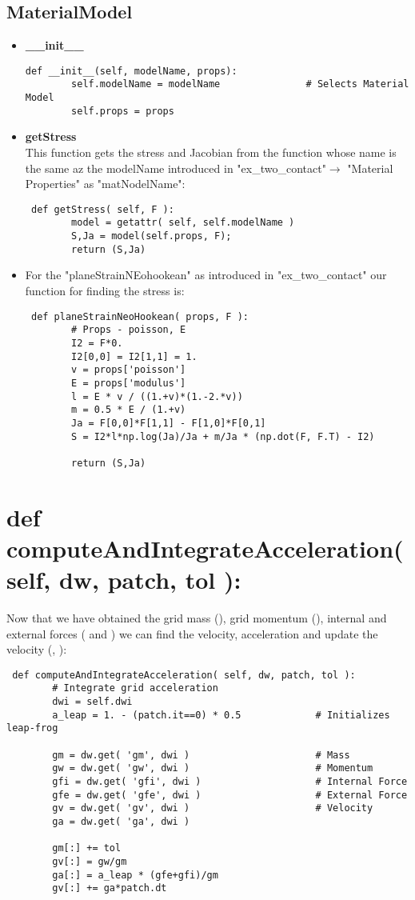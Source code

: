\documentclass[11pt,fleqn]{book} %
\begin{document}
\subsection{MaterialModel}
\begin{itemize}
\item \textbf{\_\_init\_\_}\\
\begin{lstlisting}
def __init__(self, modelName, props):
        self.modelName = modelName               # Selects Material Model
        self.props = props        
\end{lstlisting}
\item \textbf{getStress}\\
This function gets the stress and Jacobian from the function whose name is the same az the modelName introduced in "ex\_two\_contact"$\rightarrow$ "Material Properties" as "matNodelName":
\begin{lstlisting}
 def getStress( self, F ):
        model = getattr( self, self.modelName )
        S,Ja = model(self.props, F);    
        return (S,Ja)     
\end{lstlisting}
\item For the  "planeStrainNEohookean" as introduced in "ex\_two\_contact" our function for finding the stress is:
\begin{lstlisting}
 def planeStrainNeoHookean( props, F ):
        # Props - poisson, E
        I2 = F*0.
        I2[0,0] = I2[1,1] = 1.
        v = props['poisson']
        E = props['modulus']
        l = E * v / ((1.+v)*(1.-2.*v))
        m = 0.5 * E / (1.+v)
        Ja = F[0,0]*F[1,1] - F[1,0]*F[0,1]
        S = I2*l*np.log(Ja)/Ja + m/Ja * (np.dot(F, F.T) - I2)
        
        return (S,Ja)    
\end{lstlisting}
\end{itemize}


\section{ def computeAndIntegrateAcceleration( self, dw, patch, tol ):}
Now that we have obtained the grid mass (), grid momentum (), internal and external forces ( and ) we can find the velocity, acceleration and update the velocity (, ):

\begin{lstlisting}
 def computeAndIntegrateAcceleration( self, dw, patch, tol ):
        # Integrate grid acceleration
        dwi = self.dwi
        a_leap = 1. - (patch.it==0) * 0.5             # Initializes leap-frog
        
        gm = dw.get( 'gm', dwi )                      # Mass
        gw = dw.get( 'gw', dwi )                      # Momentum
        gfi = dw.get( 'gfi', dwi )                    # Internal Force
        gfe = dw.get( 'gfe', dwi )                    # External Force
        gv = dw.get( 'gv', dwi )                      # Velocity
        ga = dw.get( 'ga', dwi )
        
        gm[:] += tol
        gv[:] = gw/gm
        ga[:] = a_leap * (gfe+gfi)/gm
        gv[:] += ga*patch.dt
\end{lstlisting}
\end{document}
